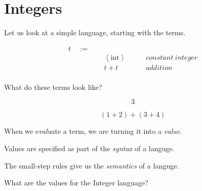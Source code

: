 
\section{Integers}

\begin{frame}[c]
  \begin{center}
    Let us look at a simple language, starting with the terms.
  \end{center}
\end{frame}

\begin{frame}
\begin{displaymath}
    \begin{aligned}
t \quad:=\quad& ~ &\\
  & ~ \left<\text{int}\right> \quad\quad &constant~integer\\
  & ~ t + t \quad\quad &addition\\
    \end{aligned}
  \end{displaymath}
\end{frame}

\begin{frame}[c]
    What do these terms look like?
\end{frame}

\begin{frame}
\begin{displaymath}
  3 
\end{displaymath}
\end{frame}

\begin{frame}
\begin{displaymath}
  (1 + 2) + (3 + 4)
\end{displaymath}
\end{frame}

\begin{frame}[c]
  When we e{\it valu}ate a term, we are turning it into a {\it value}.
\end{frame}

\begin{frame}[c]
    Values are specified as part of the {\it syntax} of a languge.
\end{frame}

\begin{frame}[c]
    The small-step rules give us the {\it semantics} of a languge.
\end{frame}

\begin{frame}[c]
  What are the values for the Integer language?
\end{frame}

